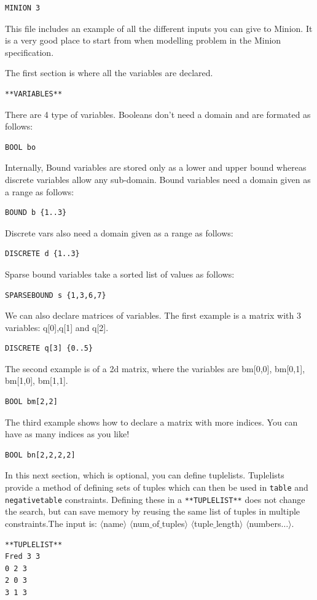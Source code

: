 \documentclass[oneside]{book}
\begin{document}
\begin{verbatim}
MINION 3
\end{verbatim}

This file includes an example of all the different inputs  you can give to Minion.  It is a very good place to start from when modelling  problem in the Minion specification. 

 The first section is where all the variables are declared.
 \begin{verbatim}
**VARIABLES**
\end{verbatim}

There are 4 type of variables. Booleans don't need a domain and are formated as follows:
 \begin{verbatim}
BOOL bo    
 \end{verbatim}

Internally, Bound variables are stored only as a lower  and upper bound whereas discrete variables allow any sub-domain.
Bound variables need a domain given as a range as follows: 
 \begin{verbatim}
BOUND b {1..3}   
 \end{verbatim}

Discrete vars also need a domain given as a range as follows:   
\begin{verbatim}
DISCRETE d {1..3} 
\end{verbatim}

Sparse bound variables take a sorted list of values as follows:
\begin{verbatim}
SPARSEBOUND s {1,3,6,7} 
\end{verbatim}

We can also declare matrices of variables. The first example is a matrix with 3 variables: q[0],q[1] and q[2].
\begin{verbatim}
DISCRETE q[3] {0..5} 
\end{verbatim}

The second example is of a 2d matrix, where the variables are bm[0,0], bm[0,1], bm[1,0], bm[1,1].
\begin{verbatim}
BOOL bm[2,2] 
\end{verbatim}

The third example shows how to declare a matrix with more indices. You can have as many indices as you like!
\begin{verbatim}
BOOL bn[2,2,2,2] 
\end{verbatim}

In this next section, which is optional, you can define tuplelists. Tuplelists provide a method of defining sets of tuples which can then be used in \texttt{table} and \texttt{negativetable} constraints. Defining these in a \texttt{**TUPLELIST**} does not change the search, but can save memory by reusing the same list of tuples in multiple constraints.The input is: $\langle$name$\rangle$ $\langle$num$\_$of$\_$tuples$\rangle$ $\langle$tuple$\_$length$\rangle$ $\langle$numbers$\ldots \rangle$.
\begin{verbatim}
**TUPLELIST**
Fred 3 3
0 2 3
2 0 3
3 1 3
\end{verbatim}
\end{document}
